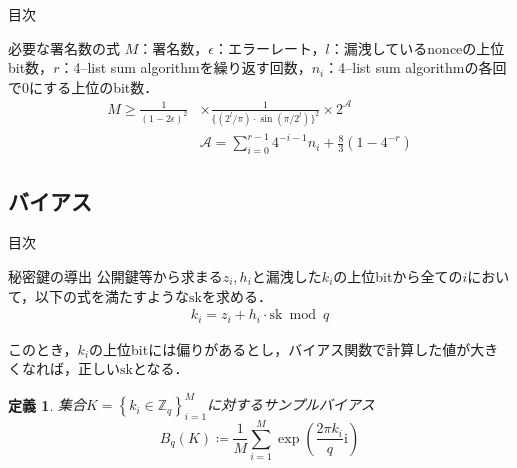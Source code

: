 \documentclass[dvipdfm]{beamer}
\newtheorem{dfn}{定義}
\theoremstyle{example}
\begin{document}
\begin{frame}{目次}
    \tableofcontents[currentsubsection]
\end{frame}

\begin{frame}{必要な署名数の式}
    $M$：署名数，$\epsilon$：エラーレート，$l$：漏洩しているnonceの上位bit数，$r$：4--list sum algorithmを繰り返す回数，$n_i$：4--list sum algorithmの各回で$0$にする上位のbit数．
    \begin{align*}
        M \geq \frac{1}{\left(1-2\epsilon\right)^2} & \times \frac{1}{\{\left(2^l/\pi\right) \cdot \sin\left(\pi/2^l\right)\}^2} \times 2^{\mathcal{A}} \\
                                                    & \mathcal{A}= \sum_{i=0}^{r-1}4^{-i-1}n_i  + \frac{8}{3}\left(1-4^{-r}\right) \nonumber
    \end{align*}
\end{frame}


\subsection{バイアス}
\begin{frame}{目次}
    \tableofcontents[currentsubsection]
\end{frame}


\begin{frame}{秘密鍵の導出}
    公開鍵等から求まる$z_i,h_i$と漏洩した$k_i$の上位bitから全ての$i$において，以下の式を満たすような$\mathrm{sk}$を求める．
    \begin{align*}
        k_i  = z_i+h_i\cdot \mathrm{sk} \bmod{q}
    \end{align*}

    このとき，$k_i$の上位bitには偏りがあるとし，バイアス関数で計算した値が大きくなれば，正しい$\mathrm{sk}$となる．

    \begin{dfn}
        集合$K=\left\{k_i \in \mathbb{Z}_q\right\}^M_{i=1}$に対するサンプルバイアス
        \begin{equation*}
            B_q\left(K\right) \coloneqq \frac{1}{M}\sum^M_{i=1}\exp\left(\frac{2\pi k_i}{q}\mathrm{i}\right)
        \end{equation*}
    \end{dfn}
\end{frame}
\end{document}
